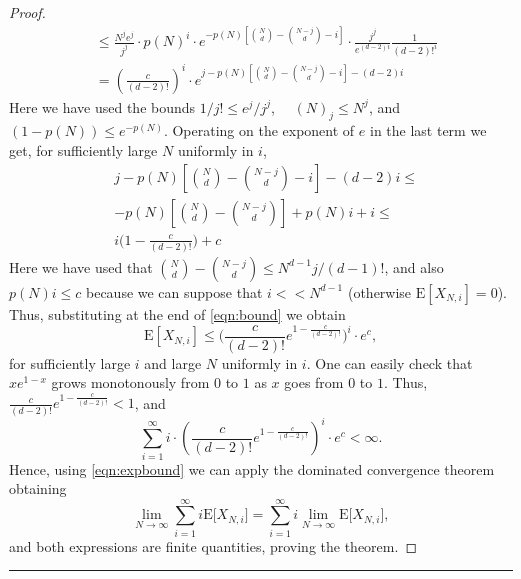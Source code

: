 \documentclass[11pt,notitlepage,a4paper]{article}
\theoremstyle{definition}
\newcommand{\LN}{\lim\limits_{N\to \infty}}
\begin{document}
\begin{proof}
\begin{align}
	&\nonumber \leq \frac{N^{j}e^{j}}{j^j}\cdot 
	p(N)^i \cdot
	e^{-p(N)\left[\binom{N}{d}-\binom{N-j}{d} - i\right]}
	\cdot \frac{j^j}{e^{(d-2)i}}\frac{1}{(d-2)!^i}\\
	&\label{eqn:bound} =\left(\frac{c}{(d-2)!}\right)^i 
	\cdot
	e^{j-p(N)\left[\binom{N}{d}-\binom{N-j}{d} - i\right]- 
	(d-2)i} 
	\end{align}
	Here we have used the bounds
	$1/j!\leq e^j/j^j$, $\quad (N)_j\leq
	N^j$, and 
	$(1-p(N))\leq e^{-p(N)}$.
	Operating on the exponent of $e$ in the last term
	we get, for sufficiently large $N$ uniformly in 
	$i$,
	\begin{align*}
	&j
	-p(N)\left[\binom{N}{d}-\binom{N-j}{d} - i\right]- 
	(d-2)i \leq \\ 
	&- p(N)\left[\binom{N}{d}-\binom{N-j}{d}\right]
	+ p(N)i + i \leq \\
	& i\Big(1 - \frac{c}{(d-2)!}\Big) + c
	\end{align*}
	Here we have used that
	$\binom{N}{d}-\binom{N-j}{d}\leq N^{d-1}j/(d-1)!$,
	and also $p(N)i\leq c$ because we can suppose that $i<<N^{d-1}$ (otherwise 
	$\mathrm{E}[X_{N,i}]=0$).
	Thus, substituting at the end of 
	\cref{eqn:bound} we obtain
	\begin{equation}
	\label{eqn:expbound}
		\mathrm{E}[X_{N,i}]\leq \Bigg(\frac{c}{(d-2)!}
		e^{1-\frac{c}{(d-2)!}} \Bigg)^i \cdot e^c,
	\end{equation}
	for sufficiently large $i$ and large $N$ uniformly
	in $i$. 
	One can easily check that $xe^{1-x}$ grows monotonously from $0$
	to $1$ as $x$ goes from $0$ to $1$. Thus, $\frac{c}{(d-2)!}
	e^{1-\frac{c}{(d-2)!}}<1$, and
	\[
	\sum_{i=1}^\infty i\cdot\left(\frac{c}{(d-2)!}
	e^{1-\frac{c}{(d-2)!}} \right)^i\cdot e^c < \infty.
	\]
	Hence, using \cref{eqn:expbound} we can
	apply the dominated convergence theorem
	obtaining
	\[
	\LN \sum_{i=1}^\infty i 
	\mathrm{E}\big[ X_{N,i}\big]
	= \sum_{i=1}^\infty i \LN \mathrm{E}\big[ X_{N,i}\big]
	,
	\]
	and both expressions are finite quantities, proving
	the theorem. 
	\end{proof}
	\noindent\rule{2cm}{0.4pt}\par
	
\end{document}
